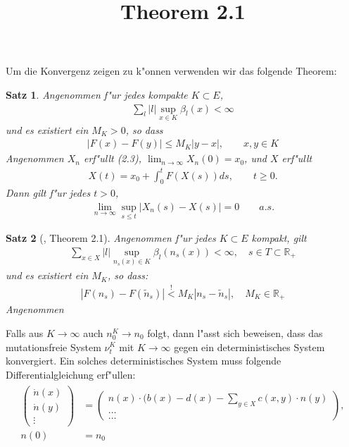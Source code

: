 \documentclass[11pt,a4paper]{article}
\title{Theorem 2.1}
\theoremstyle{plain}
\newtheorem{satz}{Satz}
\newcommand{\trvec}[3]{\begin{pmatrix}#1\\#2\\#3\end{pmatrix}}
\begin{document}
\maketitle

Um die Konvergenz zeigen zu k"onnen verwenden wir das folgende Theorem:

\begin{satz}
	Angenommen f"ur jedes kompakte $ K \subset E $,
	\begin{align}
		\sum_l |l| \sup_{x \in K} \beta_l(x) < \infty
	\end{align}
	und es existiert ein $ M_K > 0 $, so dass
	\begin{align}
		|F(x) - F(y)| \le M_K|y-x|,	\qquad x,y \in K
	\end{align}
	Angenommen $ X_n $ erf"ullt (2.3), $ \lim_{n \to \infty} X_n(0) = x_0 $, und $ X $ erf"ullt 
	\begin{align}
		X(t) = x_0 + \int_{0}^{t} F(X(s)) ds, \qquad t \ge 0.
	\end{align}
	Dann gilt f"ur jedes $ t > 0 $,
	\begin{align}
		\lim_{n\to \infty} \sup_{s\le t} |X_n(s) - X(s)| = 0 \qquad a.s.
	\end{align}
\end{satz}
	
\begin{satz}[\cite{ethier2009markov}, Theorem 2.1]
	Angenommen f"ur jedes $ K \subset E $ kompakt, gilt
	\begin{align}
		\sum_{x \in X} |l| \sup_{n_s(x) \in K}\beta_l(n_s(x)) < \infty, \quad s \in T \subset \mathbb{R}_+
	\end{align}
	und es existiert ein $ M_K $, so dass:
	\begin{align}
		\left| F(n_s) - F(\tilde{n}_s) \right| \overset{!}{<} M_K \left| n_s - \tilde{n}_s \right|, \quad M_K \in \mathbb{R}_{+}
	\end{align} 
	Angenommen 
\end{satz}






Falls aus $ K \to \infty $ auch $ n_0^K \to n_0 $ folgt, dann l"asst sich beweisen, dass das mutationsfreie System $ \nu_t^K $ mit $ K \to \infty $ gegen ein deterministisches System konvergiert. Ein solches deterministisches System muss folgende Differentialgleichung erf"ullen:
\begin{align}
\begin{split}
	\trvec{\dot{n}(x)}{\dot{n}(y)}{\vdots} &= \trvec{n(x) \cdot ( b(x) - d(x) - \sum_{y \in X}c(x,y)\cdot n(y)}{\dots}{\dots},\\
	n(0) &= n_0 
\end{split}
\end{align}
\end{document}
